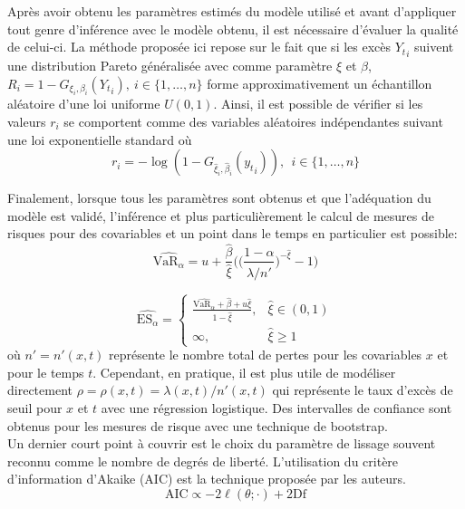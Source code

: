 Après avoir obtenu les paramètres estimés du modèle utilisé et avant d'appliquer tout genre d'inférence avec le modèle obtenu, il est nécessaire d'évaluer la qualité de celui-ci. La méthode proposée ici repose sur le fait que si les excès ${Y_t}_{i}$ suivent une distribution Pareto généralisée avec comme paramètre $\xi$ et $\beta$, $R_i = 1 - G_{\xi_i, \beta_i} ({Y_t}_{i}), \ i \in \{1, \dots, n\}$ forme approximativement un échantillon aléatoire d'une loi uniforme $U(0,1)$. Ainsi, il est possible de vérifier si les valeurs $r_i$ se comportent comme des variables aléatoires indépendantes suivant une loi exponentielle standard où
\begin{equation}\label{eq:2.2.11}
r_i = -\log(1 - G_{\hat\xi_i, \hat\beta_i}({y_t}_{i})), \ \ i \in \{1, \dots, n\}
\end{equation}

Finalement, lorsque tous les paramètres sont obtenus et que l'adéquation du modèle est validé, l'inférence et plus particulièrement le calcul de mesures de risques pour des covariables et un point dans le temps en particulier est possible:
\begin{equation}\label{eq:2.2.12}
\widehat{\text{VaR}_\alpha} = u + \frac{\hat\beta}{\hat\xi} \Bigg(\Bigg( \frac{1-\alpha}{\hat\lambda/n'}\Bigg)^{-\hat\xi} -1 \Bigg)
\end{equation}

\begin{equation}\label{eq:2.2.13}
\widehat{\text{ES}_\alpha} =
\begin{cases}
\frac{\widehat{\text{VaR}_\alpha} + \hat\beta + u\hat\xi}{1-\hat\xi}, & \hat{\xi} \in (0,1) \\
\infty, & \hat\xi 	\ge 1
\end{cases}
\end{equation}
où $n' = n'(x,t)$ représente le nombre total de pertes pour les covariables $x$ et pour le temps $t$. Cependant, en pratique, il est plus utile de modéliser directement $\rho = \rho(x, t) = \lambda(x,t)/n'(x, t)$ qui représente le taux d'excès de seuil pour $x$ et $t$ avec une régression logistique. Des intervalles de confiance sont obtenus pour les mesures de risque avec une technique de bootstrap.
\\

Un dernier court point à couvrir est le choix du paramètre de lissage souvent reconnu comme le nombre de degrés de liberté. L'utilisation du critère d'information d'Akaike (AIC) est la technique proposée par les auteurs.
\begin{equation}\label{eq:2.2.14}
\text{AIC} \propto -2 \ell(\theta; \cdot) + 2\text{Df}
\end{equation}

